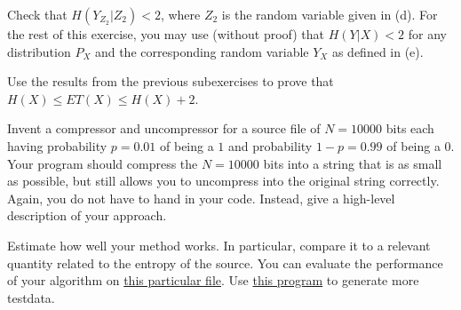 \documentclass[a4paper,10pt,landscape,twocolumn]{scrartcl}
\begin{document}
\begin{exercise}
\begin{subex}[(2pt)]
	\end{subex}
	\begin{subex}[(1pt)]
	Check that $H(Y_{Z_2}|Z_2) < 2$, where $Z_2$ is the random variable given in (d). For the rest of this exercise, you may use (without proof) that $H(Y|X) < 2$ for any distribution $P_X$ and the corresponding random variable $Y_X$ as defined in (e).
	\end{subex}
	\begin{subex}[(2pt)]
	Use the results from the previous subexercises to prove that $H(X) \leq ET(X) \leq H(X)+2$.
	\end{subex}
\end{exercise}


\begin{exercise}
\begin{subex}[(4pt)]
Invent a compressor and uncompressor for a source file of $N=10000$
bits each having probability $p=0.01$ of being a $1$ and probability $1-p = 0.99$ of being a $0$. Your program should compress the $N=10000$ bits into a string that is as small as possible, but still allows you to uncompress into the original string correctly. Again, you do not have to hand in your code. Instead, give a high-level description of your approach.
\end{subex}
\begin{subex}[(3pt)]
Estimate how well your method works. In particular, compare it to a relevant quantity related to the entropy of the source. You can evaluate the performance of your algorithm on \href{https://github.com/cschaffner/InformationTheory/raw/master/Problems/random01.txt}{this particular
  file}. Use \href{https://repl.it/@ChrisSchaffner/RandomFile}{this program} to generate more testdata.
\end{subex}
\end{exercise}
\end{document}

